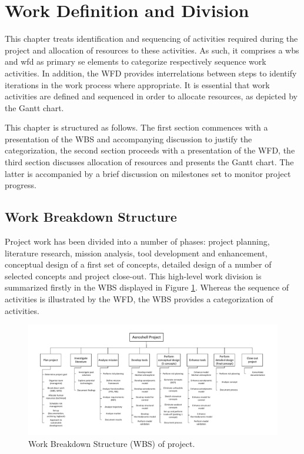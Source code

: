 \section{Work Definition and Division}
This chapter treats identification and sequencing of activities required during the project and allocation of resources to these activities. As such, it comprises a \gls{wbs} and \gls{wfd} as primary \gls{se} elements to categorize respectively sequence work activities. In addition, the WFD provides interrelations between steps to identify iterations in the work process where appropriate. It is essential that work activities are defined and sequenced in order to allocate resources, as depicted by the Gantt chart.

This chapter is structured as follows. The first section commences with a presentation of the WBS and accompanying discussion to justify the categorization, the second section proceeds with a presentation of the WFD, the third section discusses allocation of resources and presents the Gantt chart. The latter is accompanied by a brief discussion on milestones set to monitor project progress.

\subsection{Work Breakdown Structure}\label{sec:WBS}
Project work has been divided into a number of phases: project planning, literature research, mission analysis, tool development and enhancement, conceptual design of a first set of concepts, detailed design of a number of selected concepts and project close-out. This high-level work division is summarized firstly in the WBS displayed in Figure \ref{fig:wbs}. Whereas the sequence of activities is illustrated by the WFD, the WBS provides a categorization of activities. 

\begin{figure}
    \includegraphics[scale=0.8]{Figure/WBS.pdf}
    \caption{Work Breakdown Structure (WBS) of project.}
    \label{fig:wbs}
\end{figure}

